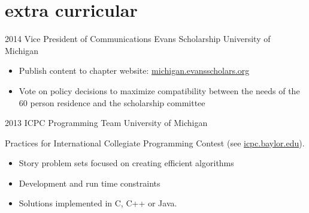\section{extra curricular}

\begin{entrylist}
\entry
{2014}
{Vice President of Communications}
{Evans Scholarship University of Michigan}
{
	\vspace{-4mm}%
	\begin{itemize}
		\item Publish content to chapter website: \href{http://michigan.evansscholars.org/}{michigan.evansscholars.org}
		\item Vote on policy decisions to maximize compatibility between the needs of the 60 person residence and the scholarship committee
	\end{itemize}
}
\entry
{2013}
{ICPC Programming Team}
{University of Michigan}
{
	Practices for International Collegiate Programming Contest (see \href{http://icpc.baylor.edu/}{icpc.baylor.edu}).
	\begin{itemize}
		\item Story problem sets focused on creating efficient algorithms
		\item Development and run time constraints
		\item Solutions implemented in C, C++ or Java.
	\end{itemize}
}
\end{entrylist}
